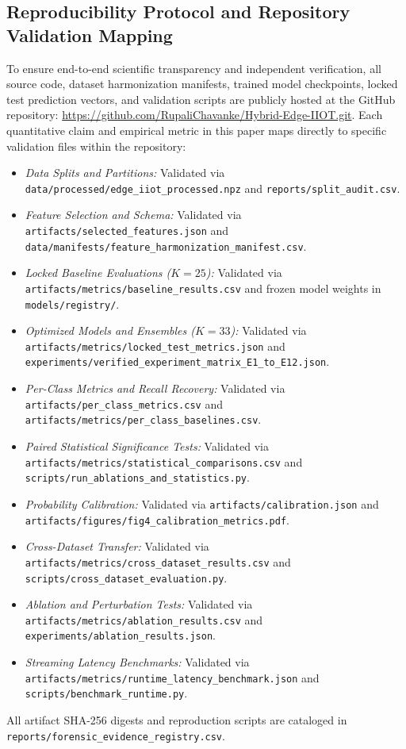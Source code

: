 \documentclass[10pt,journal,twocolumn]{IEEEtran}
\begin{document}
\subsection{Reproducibility Protocol and Repository Validation Mapping}
To ensure end-to-end scientific transparency and independent verification, all source code, dataset harmonization manifests, trained model checkpoints, locked test prediction vectors, and validation scripts are publicly hosted at the GitHub repository: \url{https://github.com/RupaliChavanke/Hybrid-Edge-IIOT.git}. Each quantitative claim and empirical metric in this paper maps directly to specific validation files within the repository:
\begin{itemize}
    \item \emph{Data Splits and Partitions:} Validated via \nolinkurl{data/processed/edge_iiot_processed.npz} and \nolinkurl{reports/split_audit.csv}.
    \item \emph{Feature Selection and Schema:} Validated via \nolinkurl{artifacts/selected_features.json} and \nolinkurl{data/manifests/feature_harmonization_manifest.csv}.
    \item \emph{Locked Baseline Evaluations ($K=25$):} Validated via \nolinkurl{artifacts/metrics/baseline_results.csv} and frozen model weights in \nolinkurl{models/registry/}.
    \item \emph{Optimized Models and Ensembles ($K=33$):} Validated via \nolinkurl{artifacts/metrics/locked_test_metrics.json} and \nolinkurl{experiments/verified_experiment_matrix_E1_to_E12.json}.
    \item \emph{Per-Class Metrics and Recall Recovery:} Validated via \nolinkurl{artifacts/per_class_metrics.csv} and \nolinkurl{artifacts/metrics/per_class_baselines.csv}.
    \item \emph{Paired Statistical Significance Tests:} Validated via \nolinkurl{artifacts/metrics/statistical_comparisons.csv} and \nolinkurl{scripts/run_ablations_and_statistics.py}.
    \item \emph{Probability Calibration:} Validated via \nolinkurl{artifacts/calibration.json} and \nolinkurl{artifacts/figures/fig4_calibration_metrics.pdf}.
    \item \emph{Cross-Dataset Transfer:} Validated via \nolinkurl{artifacts/metrics/cross_dataset_results.csv} and \nolinkurl{scripts/cross_dataset_evaluation.py}.
    \item \emph{Ablation and Perturbation Tests:} Validated via \nolinkurl{artifacts/metrics/ablation_results.csv} and \nolinkurl{experiments/ablation_results.json}.
    \item \emph{Streaming Latency Benchmarks:} Validated via \nolinkurl{artifacts/metrics/runtime_latency_benchmark.json} and \nolinkurl{scripts/benchmark_runtime.py}.
\end{itemize}
All artifact SHA-256 digests and reproduction scripts are cataloged in \nolinkurl{reports/forensic_evidence_registry.csv}.
\end{document}
